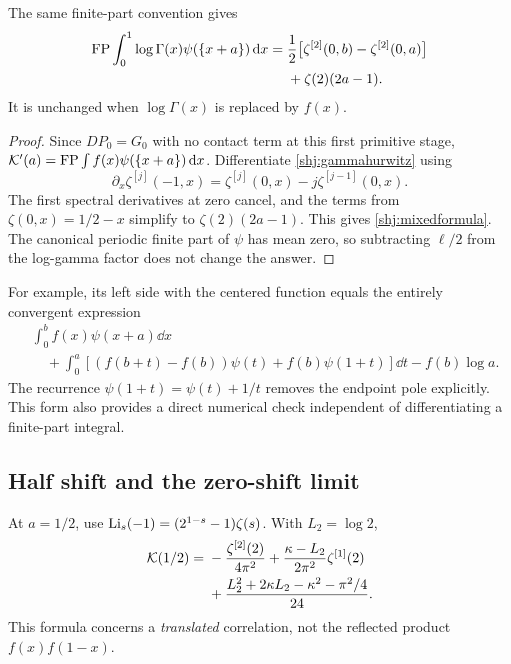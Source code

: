 \begin{corollary}\label{shj:mixedgamma}
The same finite-part convention gives
\begin{align}
\operatorname{FP}\int_0^1\log\Gamma(x)\psi(\{x+a\})\,\mathrm{d} x
={}&\frac12\big[\zeta^{[2]}(0,b)-\zeta^{[2]}(0,a)\big]\notag\\
&+\zeta(2)(2a-1).
\label{shj:mixedformula}
\end{align}
It is unchanged when $\log\Gamma(x)$ is replaced by $f(x)$.
\end{corollary}
\begin{proof}
Since $DP_0=G_0$ with no contact term at this first primitive stage,
$\mathcal K'(a)=\operatorname{FP}\int f(x)\psi(\{x+a\})\,\mathrm{d} x$.
Differentiate \eqref{shj:gammahurwitz} using
\[
\partial_x\zeta^{[j]}(-1,x)
=\zeta^{[j]}(0,x)-j\zeta^{[j-1]}(0,x).
\]
The first spectral derivatives at zero cancel, and the terms from
$\zeta(0,x)=1/2-x$ simplify to $\zeta(2)(2a-1)$. This gives \eqref{shj:mixedformula}. The canonical periodic finite part of $\psi$ has mean zero, so subtracting $\ell/2$ from the log-gamma factor does not change the answer.
\end{proof}
For example, its left side with the centered function equals the entirely convergent expression
\begin{align*}
&\int_0^b f(x)\psi(x+a)\dd x\\
&\quad+\int_0^a\left[(f(b+t)-f(b))\psi(t)+f(b)\psi(1+t)\right]\dd t
-f(b)\log a.
\end{align*}
The recurrence $\psi(1+t)=\psi(t)+1/t$ removes the endpoint pole explicitly. This form also provides a direct numerical check independent of differentiating a finite-part integral.

\subsection{Half shift and the zero-shift limit}
At $a=1/2$, use $\operatorname{Li}_s(-1)=(2^{1-s}-1)\zeta(s)$. With $L_2=\log2$,
\begin{align}
\mathcal K(1/2)={}&-\frac{\zeta^{[2]}(2)}{4\pi^2}
+\frac{\kappa-L_2}{2\pi^2}\zeta^{[1]}(2)\notag\\
&+\frac{L_2^2+2\kappa L_2-\kappa^2-\pi^2/4}{24}.
\label{shj:gammahalf}
\end{align}
This formula concerns a \emph{translated} correlation, not the reflected product $f(x)f(1-x)$.

